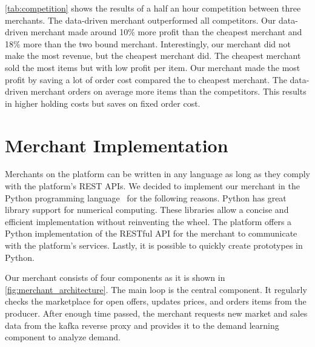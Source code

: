 \cref{tab:competition} shows the results of a half an hour competition between three merchants.
The data-driven merchant outperformed all competitors.
Our data-driven merchant made around 10\% more profit than the cheapest merchant and 18\% more than the two bound merchant.
Interestingly, our merchant did not make the most revenue, but the cheapest merchant did.
The cheapest merchant sold the most items but with low profit per item.
Our merchant made the most profit by saving a lot of order cost compared the to cheapest merchant.
The data-driven merchant orders on average more items than the competitors.
This results in higher holding costs but saves on fixed order cost.


%

\section{Merchant Implementation}
\label{section:merchant_implementation}
Merchants on the \pricewars platform can be written in any language as long as they comply with the platform's REST APIs.
We decided to implement our merchant in the Python programming language~\cite{DBLP:conf/usenix/Rossum07} for the following reasons.
Python has great library support for numerical computing.
These libraries allow a concise and efficient implementation without reinventing the wheel.
The \pricewars platform offers a Python implementation of the RESTful API for the merchant to communicate with the platform's services.
Lastly, it is possible to quickly create prototypes in Python.

Our merchant consists of four components as it is shown in \cref{fig:merchant_architecture}.
The main loop is the central component.
It regularly checks the marketplace for open offers, updates prices, and orders items from the producer.
After enough time passed, the merchant requests new market and sales data from the kafka reverse proxy and provides it to the demand learning component to analyze demand.

